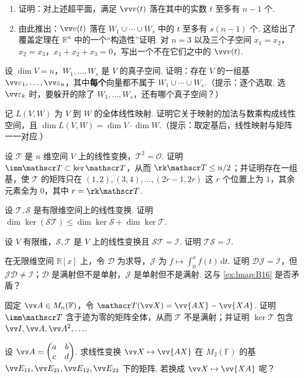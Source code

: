 {\begin{exB}
\begin{enumerate}
				\item 证明：对上述超平面，满足 $\vv v(t)$ 落在其中的实数 $t$ 至多有 $n-1$ 个.
				\item 由此推出：$\vv v(t)$ 落在 $W_1\cup\cdots\cup W_s$ 中的 $t$ 至多有 $s(n-1)$ 个. 这给出了覆盖定理在 $\mathbb{R}^n$ 中的一个“构造性”证明. 对 $n=3$ 以及三个子空间 $x_1=x_2$，$x_2=x_3$，$x_1+x_2+x_3=0$，写出一个不在它们之中的 $\vv v(t)$.
			\end{enumerate}
			\item\label{ex:lmap:B12} 设 $\dim V=n$，$W_1,\ldots,W_s$ 是 $V$ 的真子空间. 证明：存在 $V$ 的一组基 $\vv\varepsilon_1,\ldots,\vv\varepsilon_n$，其中\textbf{每个}向量都不属于 $W_1\cup\cdots\cup W_s$.（提示：逐个选取. 选 $\vv\varepsilon_k$ 时，要躲开的除了 $W_1,\ldots,W_s$，还有哪个真子空间？）
			\item\label{ex:lmap:B13} 记 $L(V,W)$ 为 $V$ 到 $W$ 的全体线性映射. 证明它关于映射的加法与数乘构成线性空间，且 $\dim L(V,W)=\dim V\cdot\dim W$.（提示：取定基后，线性映射与矩阵一一对应.）
			\item\label{ex:lmap:B14} 设 $\mathscr T$ 是 $n$ 维空间 $V$ 上的线性变换，$\mathscr T^2=\mathscr O$. 证明 $\imm\mathscr T\subset\ker\mathscr T$，从而 $\rk\mathscr T\le n/2$；并证明存在一组基，使 $\mathscr T$ 的矩阵只在 $(1,2),(3,4),\ldots,(2r-1,2r)$ 这 $r$ 个位置上为 $1$，其余元素全为 $0$，其中 $r=\rk\mathscr T$.
			\item\label{ex:lmap:B15} 设 $\mathscr T,\mathscr S$ 是有限维空间上的线性变换. 证明 $\dim\ker(\mathscr{ST})\le\dim\ker\mathscr S+\dim\ker\mathscr T$.
			\item\label{ex:lmap:B16} 设 $V$ 有限维，$\mathscr S,\mathscr T$ 是 $V$ 上的线性变换且 $\mathscr{ST}=\mathscr I$. 证明 $\mathscr{TS}=\mathscr I$.
			\item\label{ex:lmap:B17} 在无限维空间 $\mathbb{R}[x]$ 上，令 $\mathscr D$ 为求导，$\mathscr J$ 为 $f\mapsto\int_0^xf(t)\,\mathrm dt$. 证明 $\mathscr{DJ}=\mathscr I$，但 $\mathscr{JD}\ne\mathscr I$；$\mathscr D$ 是满射但不是单射，$\mathscr J$ 是单射但不是满射. 这与 \ref{ex:lmap:B16} 是否矛盾？
			\item\label{ex:lmap:B18} 固定 $\vv A\in M_n(\mathbb{F})$，令 $\mathscr T(\vv X)=\vv{AX}-\vv{XA}$. 证明 $\imm\mathscr T$ 含于迹为零的矩阵全体，从而 $\mathscr T$ 不是满射；并证明 $\ker\mathscr T$ 包含 $\vv I,\vv A,\vv A^2,\ldots$.
			\item\label{ex:lmap:B19} 设 $\vv A=\begin{pmatrix}a&b\\c&d\end{pmatrix}$. 求线性变换 $\vv X\mapsto\vv{AX}$ 在 $M_2(\mathbb{F})$ 的基 $\vv E_{11},\vv E_{21},\vv E_{12},\vv E_{22}$ 下的矩阵. 若换成 $\vv X\mapsto\vv{XA}$ 呢？

\end{exB}}

